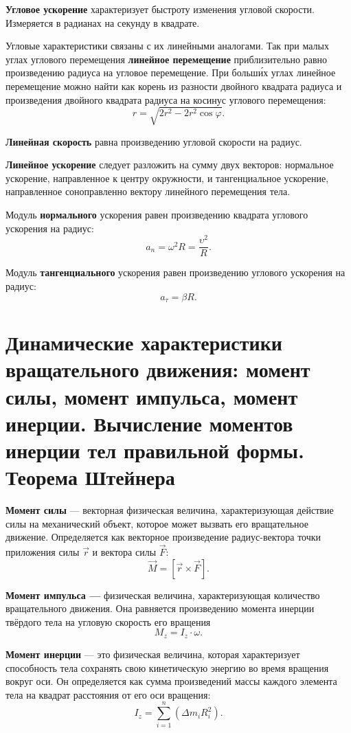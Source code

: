 \documentclass[10pt]{scrbook}
\begin{document}
\textbf{Угловое ускорение} характеризует быстроту изменения угловой скорости. Измеряется
в радианах на секунду в квадрате.

Угловые характеристики связаны с их линейными аналогами. Так при малых углах
углового перемещения \textbf{линейное перемещение} приблизительно равно произведению
радиуса на угловое перемещение. При больши́х углах линейное перемещение можно
найти как корень из разности двойного квадрата радиуса и произведения двойного
квадрата радиуса на косинус углового перемещения: \[
	r = \sqrt{2r^2 - 2r^2 \cos{\varphi}}
	.\]

\textbf{Линейная скорость} равна произведению угловой скорости на радиус.

\textbf{Линейное ускорение} следует разложить на сумму двух векторов: нормальное
ускорение, направленное к центру окружности, и тангенциальное ускорение,
направленное соноправленно вектору линейного перемещения тела.

Модуль \textbf{нормального} ускорения равен произведению квадрата углового
ускорения на радиус: \[
	a_n = \omega^2 R = \frac{\upsilon^2}{R}
	.\]

Модуль \textbf{тангенциального} ускорения равен произведению углового ускорения
на радиус: \[
	a_\tau = \beta R
	.\]

\section[седьмой вопрос]{Динамические характеристики вращательного движения:
  момент силы, момент импульса, момент инерции. Вычисление моментов инерции тел
  правильной формы. Теорема Штейнера}

\textbf{Момент силы} --- векторная физическая величина, характеризующая
действие силы на механический объект, которое может вызвать его вращательное
движение. Определяется как векторное произведение радиус-вектора точки
приложения силы $\vec {r}$ и вектора силы $\vec {F}$: \[
	\vec{M} = [\vec{r} \times \vec{F}]
	.\]

\textbf{Момент импульса ---} физическая величина, характеризующая количество
вращательного движения. Она равняется произведению момента инерции твёрдого
тела на угловую скорость его вращения \[
	M_z = I_z \cdot \omega
	.\]

\textbf{Момент инерции} --- это физическая величина, которая характеризует
способность тела сохранять свою кинетическую энергию во время вращения вокруг
оси. Он определяется как сумма произведений массы каждого элемента тела на
квадрат расстояния от его оси вращения: \[
	I_z = \sum_{i=1}^{n} (\Delta m_i R_i^2)%
	.\]
\end{document}
